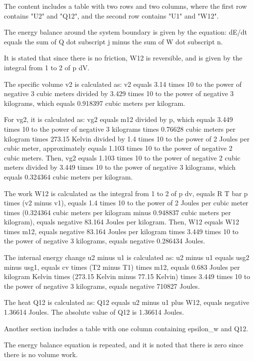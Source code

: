 The content includes a table with two rows and two columns, where the first row contains "U2" and "Q12", and the second row contains "U1" and "W12".

The energy balance around the system boundary is given by the equation:
dE/dt equals the sum of Q dot subscript j minus the sum of W dot subscript n.

It is stated that since there is no friction, W12 is reversible, and is given by the integral from 1 to 2 of p dV.

The specific volume v2 is calculated as:
v2 equals 3.14 times 10 to the power of negative 3 cubic meters divided by 3.429 times 10 to the power of negative 3 kilograms, which equals 0.918397 cubic meters per kilogram.

For vg2, it is calculated as:
vg2 equals m12 divided by p, which equals 3.449 times 10 to the power of negative 3 kilograms times 0.76628 cubic meters per kilogram times 273.15 Kelvin divided by 1.4 times 10 to the power of 2 Joules per cubic meter, approximately equals 1.103 times 10 to the power of negative 2 cubic meters.
Then, vg2 equals 1.103 times 10 to the power of negative 2 cubic meters divided by 3.449 times 10 to the power of negative 3 kilograms, which equals 0.324364 cubic meters per kilogram.

The work W12 is calculated as the integral from 1 to 2 of p dv, equals R T bar p times (v2 minus v1), equals 1.4 times 10 to the power of 2 Joules per cubic meter times (0.324364 cubic meters per kilogram minus 0.948837 cubic meters per kilogram), equals negative 83.164 Joules per kilogram.
Then, W12 equals W12 times m12, equals negative 83.164 Joules per kilogram times 3.449 times 10 to the power of negative 3 kilograms, equals negative 0.286434 Joules.

The internal energy change u2 minus u1 is calculated as:
u2 minus u1 equals usg2 minus usg1, equals cv times (T2 minus T1) times m12, equals 0.683 Joules per kilogram Kelvin times (273.15 Kelvin minus 77.15 Kelvin) times 3.449 times 10 to the power of negative 3 kilograms, equals negative 710827 Joules.

The heat Q12 is calculated as:
Q12 equals u2 minus u1 plus W12, equals negative 1.36614 Joules.
The absolute value of Q12 is 1.36614 Joules.

Another section includes a table with one column containing epsilon_w and Q12.

The energy balance equation is repeated, and it is noted that there is zero since there is no volume work.

